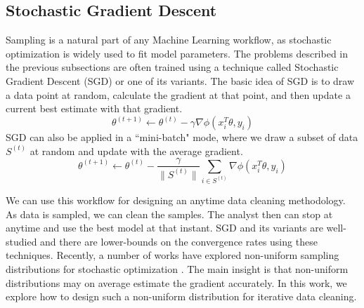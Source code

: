 \subsection{Stochastic Gradient Descent}
Sampling is a natural part of any Machine Learning workflow, as stochastic optimization is widely used to fit model parameters.
The problems described in the previous subsections are often trained using a technique called Stochastic Gradient Descent (SGD) or one of its variants.
The basic idea of SGD is to draw a data point at random, calculate the gradient at that point, and then update a current best estimate with that gradient.
\[
\theta^{(t+1)}\leftarrow\theta^{(t)}-\gamma\nabla\phi(x_{i}^T\theta,y_{i})
\]
 SGD can also be applied in a ``mini-batch" mode, where we draw a subset of data $S^{(t)}$ at random and update with the average gradient.
 \[
 \theta^{(t+1)}\leftarrow\theta^{(t)}-\frac{\gamma}{\|S^{(t)}\|}\sum_{i\in S^{(t)}}\nabla\phi(x_{i}^T\theta,y_{i})
 \]

We can use this workflow for designing an anytime data cleaning methodology.
As data is sampled, we can clean the samples.
The analyst then can stop at anytime and use the best model at that instant.
SGD and its variants are well-studied and there are lower-bounds on the convergence rates using these techniques. 
Recently, a number of works have explored non-uniform sampling distributions for stochastic optimization \cite{zhao2014stochastic, qu2014randomized}.
The main insight is that non-uniform distributions may on average estimate the gradient accurately.
In this work, we explore how to design such a non-uniform distribution for iterative data cleaning.




 